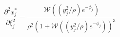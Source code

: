 \documentclass[letterpaper]{article} %
\newcommand{\autoref}{\Cref}
\begin{document}
\begin{equation}
\frac{\partial^2 x_j^*}{\partial \xi_j^2}  = \frac{\mathscr{W}((y_j^2/\rho) e^{-\phi_j} )}{\rho^2(1+\mathscr{W}((y_j^2/\rho) e^{-\phi_j} ))^3}
\label{eq:d2_x*_start}
\end{equation}

 



\end{document}
